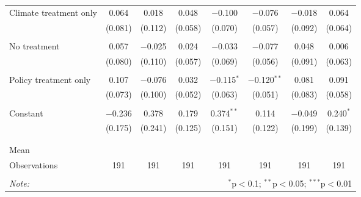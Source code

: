 \begin{tabular}{@{\extracolsep{5pt}}lccccccc}
 Climate treatment only & 0.064 & 0.018 & 0.048 & $-$0.100 & $-$0.076 & $-$0.018 & 0.064 \\ 
  & (0.081) & (0.112) & (0.058) & (0.070) & (0.057) & (0.092) & (0.064) \\ 
  & & & & & & & \\ 
 No treatment & 0.057 & $-$0.025 & 0.024 & $-$0.033 & $-$0.077 & 0.048 & 0.006 \\ 
  & (0.080) & (0.110) & (0.057) & (0.069) & (0.056) & (0.091) & (0.063) \\ 
  & & & & & & & \\ 
 Policy treatment only & 0.107 & $-$0.076 & 0.032 & $-$0.115$^{*}$ & $-$0.120$^{**}$ & 0.081 & 0.091 \\ 
  & (0.073) & (0.100) & (0.052) & (0.063) & (0.051) & (0.083) & (0.058) \\ 
  & & & & & & & \\ 
 Constant & $-$0.236 & 0.378 & 0.179 & 0.374$^{**}$ & 0.114 & $-$0.049 & 0.240$^{*}$ \\ 
  & (0.175) & (0.241) & (0.125) & (0.151) & (0.122) & (0.199) & (0.139) \\ 
  & & & & & & & \\ 
\hline \\[-1.8ex] 
Mean &  &  &  &  &  &  &  \\ 
Observations & 191 & 191 & 191 & 191 & 191 & 191 & 191 \\ 
\hline 
\hline \\[-1.8ex] 
\textit{Note:}  & \multicolumn{7}{r}{$^{*}$p$<$0.1; $^{**}$p$<$0.05; $^{***}$p$<$0.01} \\ 
\end{tabular} 
